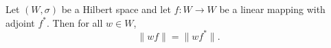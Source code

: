 Let $(W, \sigma)$ be a Hilbert space and let $f \colon W \to W$ be a linear mapping with adjoint $f^*$. Then for all $w \in W$,
$$
\|w f\| = \|w f^*\|.
$$
